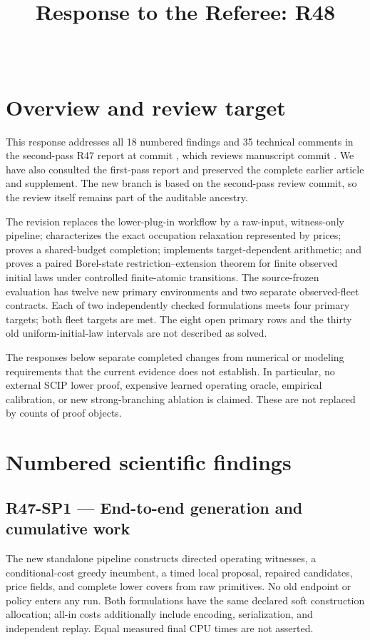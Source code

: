 

\begin{frontmatter}
\title{Response to the Referee: R48}
\begin{aug}\author[id=au1,addressref={add1}]{~}\address[id=add1]{}\end{aug}
\end{frontmatter}
\section{Overview and review target}
This response addresses all 18 numbered findings and 35 technical comments in the second-pass R47 report at commit , which reviews manuscript commit . We have also consulted the first-pass report and preserved the complete earlier article and supplement. The new branch is based on the second-pass review commit, so the review itself remains part of the auditable ancestry.

The revision replaces the lower-plug-in workflow by a raw-input, witness-only pipeline; characterizes the exact occupation relaxation represented by prices; proves a shared-budget completion; implements target-dependent arithmetic; and proves a paired Borel-state restriction--extension theorem for finite observed initial laws under controlled finite-atomic transitions. The source-frozen evaluation has twelve new primary environments and two separate observed-fleet contracts. Each of two independently checked formulations meets four primary targets; both fleet targets are met. The eight open primary rows and the thirty old uniform-initial-law intervals are not described as solved.

The responses below separate completed changes from numerical or modeling requirements that the current evidence does not establish. In particular, no external SCIP lower proof, expensive learned operating oracle, empirical calibration, or new strong-branching ablation is claimed. These are not replaced by counts of proof objects.
\section{Numbered scientific findings}
\subsection{R47-SP1 --- End-to-end generation and cumulative work}
The new standalone pipeline constructs directed operating witnesses, a conditional-cost greedy incumbent, a timed local proposal, repaired candidates, price fields, and complete lower covers from raw primitives. No old endpoint or policy enters any run. Both formulations have the same declared soft construction allocation; all-in costs additionally include encoding, serialization, and independent replay. Equal measured final CPU times are not asserted.

